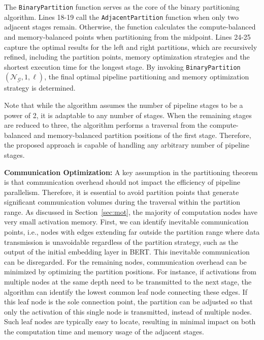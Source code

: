 The \texttt{BinaryPartition} function serves as the core of the binary partitioning algorithm.
Lines 18-19 call the \texttt{AdjacentPartition} function when only two adjacent stages remain.
Otherwise, the function calculates the compute-balanced and memory-balanced points when partitioning from the midpoint.
Lines 24-25 capture the optimal results for the left and right partitions,
which are recursively refined, including the partition points, memory optimization strategies
and the shortest execution time for the longest stage.
By invoking \texttt{BinaryPartition}$(\mathcal{N}_\mathcal{G}, 1, \ell)$,
the final optimal pipeline partitioning and memory optimization strategy is determined.

Note that while the algorithm assumes the number of pipeline stages to be a power of 2,
it is adaptable to any number of stages.
When the remaining stages are reduced to three,
the algorithm performs a traversal from the compute-balanced and memory-balanced partition positions of the first stage.
Therefore, the proposed approach is capable of handling any arbitrary number of pipeline stages.

\textbf{Communication Optimization:} A key assumption in the partitioning theorem is
that communication overhead should not impact the efficiency of pipeline parallelism.
Therefore, it is essential to avoid partition points that generate significant
communication volumes during the traversal within the partition range.
As discussed in Section~\ref{sec:mot}, the majority of computation nodes have very small activation memory.
First, we can identify inevitable communication points,
i.e., nodes with edges extending far outside
the partition range where data transmission is unavoidable regardless of the partition strategy,
such as the output of the initial embedding layer in BERT.
This inevitable communication can be disregarded.
For the remaining nodes, communication overhead can be minimized by optimizing the partition positions.
For instance, if activations from multiple nodes at the same depth need to be transmitted to the next stage,
the algorithm can identify the lowest common leaf node connecting these edges.
If this leaf node is the sole connection point,
the partition can be adjusted so that only the activation of this single node is transmitted, instead of multiple nodes.
Such leaf nodes are typically easy to locate,
resulting in minimal impact on both the computation time and memory usage of the adjacent stages.


